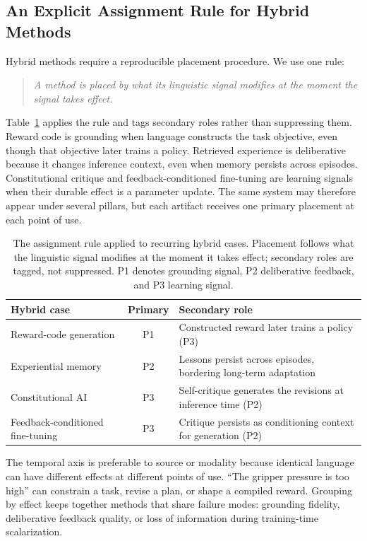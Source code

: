 \subsection{An Explicit Assignment Rule for Hybrid Methods}
\label{subsec:assignment}

Hybrid methods require a reproducible placement procedure. We use one rule:
\begin{quote}
    \emph{A method is placed by what its linguistic signal modifies at the moment the signal takes effect.}
\end{quote}
Table~\ref{tab:hybrid} applies the rule and tags secondary roles rather than suppressing them. Reward code is grounding when language constructs the task objective, even though that objective later trains a policy. Retrieved experience is deliberative because it changes inference context, even when memory persists across episodes. Constitutional critique and feedback-conditioned fine-tuning are learning signals when their durable effect is a parameter update. The same system may therefore appear under several pillars, but each artifact receives one primary placement at each point of use.

\begin{table}[t]
    \centering
    \small
    \renewcommand{\arraystretch}{1.15}
    \caption{The assignment rule applied to recurring hybrid cases. Placement follows what the linguistic signal modifies at the moment it takes effect; secondary roles are tagged, not suppressed. P1 denotes grounding signal, P2 deliberative feedback, and P3 learning signal.}
    \label{tab:hybrid}
    \begin{tabular}{@{} p{} c p{} @{}}
        \toprule
        \textbf{Hybrid case} & \textbf{Primary} & \textbf{Secondary role} \\
        \midrule
        Reward-code generation \citep{ma2024eureka,xie2024text2reward} & P1 & Constructed reward later trains a policy (P3) \\
        Experiential memory \citep{shinn2023reflexion,suzgun2026dynamic} & P2 & Lessons persist across episodes, bordering long-term adaptation \\
        Constitutional AI \citep{bai2022constitutional} & P3 & Self-critique generates the revisions at inference time (P2) \\
        Feedback-conditioned fine-tuning \citep{luo2025fcp} & P3 & Critique persists as conditioning context for generation (P2) \\
        \bottomrule
    \end{tabular}
\end{table}

The temporal axis is preferable to source or modality because identical language can have different effects at different points of use. ``The gripper pressure is too high'' can constrain a task, revise a plan, or shape a compiled reward. Grouping by effect keeps together methods that share failure modes: grounding fidelity, deliberative feedback quality, or loss of information during training-time scalarization.
